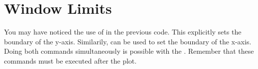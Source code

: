 \section*{Window Limits} %

You may have noticed the use of  in the previous code. This explicitly sets the boundary of the y-axis. Similarily,  can be used to set the boundary of the x-axis.
Doing both commands simultaneously is possible with the .
Remember that these commands must be executed after the plot.

\begin{comment} %
\begin{table}[H]
\centering
\begin{tabular}{r|l}
    Function & Description\\
    \hline
    \li{legend()} & Place a legend in the plot\\
    \li{title()} & Add a title to the plot\\
    \li{xlim()} & Set the limits of the $x$-axis\\
    \li{ylim()} & Set the limits of the $y$-axis\\
    \li{xlabel()} & Add a label to the $x$-axis\\
    \li{ylabel()} & Add a label to the $y$-axis
\end{tabular}
\end{table}
\end{comment}


